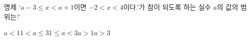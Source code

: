명제 ‘$a-3\le x<a+1$이면 $-2<x<4$이다.’가 참이 되도록 하는 실수 $a$의 값의 범위는?
\begin{choices32}{$a<1$}{$1<a\le 3$}{$1\le a<3$}{$a>1$}{$a>3$}\end{choices32}
